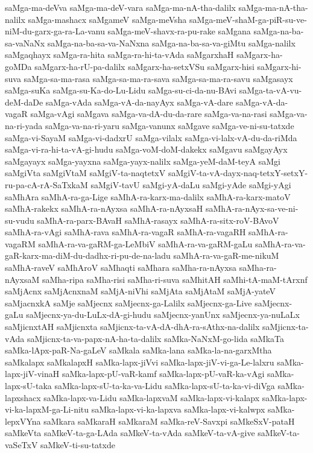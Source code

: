 {saMga-ma-deVva
saMga-ma-deV-vara
saMga-ma-nA-tha-dalilx
saMga-ma-nA-tha-nalilx
saMga-mashacx
saMgameV
saMga-meVsha
saMga-meV-shaM-ga-piR-su-ve-niM-du-garx-ga-ra-La-vanu
saMga-meV-shavx-ra-pu-rake
saMgana
saMga-na-ba-sa-vaNaNx
saMga-na-ba-sa-va-NaNxna
saMga-na-ba-sa-va-giMtu
saMga-nalilx
saMgaqhayx
saMga-ra-hita
saMga-ra-hi-ta-vAda
saMgarxhaH
saMgarx-ha-goMDa
saMgarx-ha-rU-pa-dalilx
saMgarx-ha-setxVSu
saMgarx-hisi
saMgarx-hi-suva
saMga-sa-ma-rasa
saMga-sa-ma-ra-sava
saMga-sa-ma-ra-savu
saMgasayx
saMga-suKa
saMga-su-Ka-do-Lu-Lidu
saMga-su-ci-da-nu-BAvi
saMga-ta-vA-vu-deM-daDe
saMga-vAda
saMga-vA-da-nayAyx
saMga-vA-dare
saMga-vA-da-vagaR
saMga-vAgi
saMgava
saMga-va-dA-du-da-rare
saMga-va-na-rasi
saMga-va-na-ri-yada
saMga-va-na-ri-yaru
saMga-vanunx
saMgave
saMga-ve-ni-su-tatxde
saMga-vi-SayaM
saMga-vi-dadxrU
saMga-vilalx
saMga-vi-lalx-vA-du-da-riMda
saMga-vi-ra-hi-ta-vA-gi-hudu
saMga-voM-doM-dakekx
saMgavu
saMgayAyx
saMgayayx
saMga-yayxna
saMga-yayx-nalilx
saMga-yeM-daM-teyA
saMgi
saMgiVta
saMgiVtaM
saMgiV-ta-naqtetxV
saMgiV-ta-vA-dayx-naq-tetxY-setxY-ru-pa-cA-rA-SaTxkaM
saMgiV-tavU
saMgi-yA-daLu
saMgi-yAde
saMgi-yAgi
saMhAra
saMhA-ra-ga-Lige
saMhA-ra-karx-ma-dalilx
saMhA-ra-karx-matoV
saMhA-rakekx
saMhA-ra-nAyxsa
saMhA-ra-nAyxsaH
saMhA-ra-nAyx-sa-ve-ni-su-vudu
saMhA-ra-parx-BAvaH
saMhA-rasayx
saMhA-ra-sitx-roV-BAvoV
saMhA-ra-vAgi
saMhA-rava
saMhA-ra-vagaR
saMhA-ra-vagaRH
saMhA-ra-vagaRM
saMhA-ra-va-gaRM-ga-LeMbiV
saMhA-ra-va-gaRM-gaLu
saMhA-ra-va-gaR-karx-ma-diM-du-dadhx-ri-pu-de-na-ladu
saMhA-ra-va-gaR-me-nikuM
saMhA-raveV
saMhAroV
saMhaqti
saMhara
saMha-ra-nAyxsa
saMha-ra-nAyxsaM
saMha-ripa
saMha-risi
saMha-ri-suva
saMhitAH
saMhi-tA-maM-tArxnf
saMjAcnx
saMjAcnxnaM
saMjA-niVhi
saMjAta
saMjAtaM
saMjA-yateV
saMjacnxkA
saMje
saMjecnx
saMjecnx-ga-Lalilx
saMjecnx-ga-Live
saMjecnx-gaLu
saMjecnx-ya-du-LuLx-dA-gi-hudu
saMjecnx-yanUnx
saMjecnx-ya-nuLaLx
saMjicnxtAH
saMjicnxta
saMjicnx-ta-vA-dA-dhA-ra-sAthx-na-dalilx
saMjicnx-ta-vAda
saMjicnx-ta-va-papx-nA-ha-ta-dalilx
saMka-NaNxM-go-lida
saMkaTa
saMka-lApx-paR-Na-gaLeV
saMkala
saMka-lana
saMka-la-na-garxMtha
saMkalapx
saMkalapxH
saMka-lapx-jiVvi
saMka-lapx-jiV-vi-ga-Le-lalxru
saMka-lapx-jiV-vinaH
saMka-lapx-pU-vaR-kamf
saMka-lapx-pU-vaR-ka-vAgi
saMka-lapx-sU-taka
saMka-lapx-sU-ta-ka-va-Lidu
saMka-lapx-sU-ta-ka-vi-diVga
saMka-lapxshacx
saMka-lapx-va-Lidu
saMka-lapxvaM
saMka-lapx-vi-kalapx
saMka-lapx-vi-ka-lapxM-ga-Li-nitu
saMka-lapx-vi-ka-lapxva
saMka-lapx-vi-kalwpx
saMka-lepxVYna
saMkara
saMkaraH
saMkaraM
saMka-reV-Savxpi
saMkeSxV-pataH
saMkeVta
saMkeV-ta-ga-LAda
saMkeV-ta-vAda
saMkeV-ta-vA-give
saMkeV-ta-vaSeTxV
saMkeV-ti-su-tatxde
}
